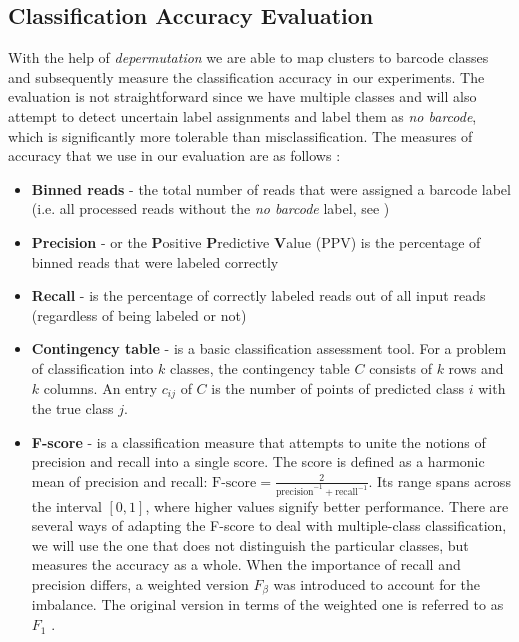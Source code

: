 \subsection{Classification Accuracy Evaluation}
\label{sec:classification_metrics}
With the help of \textit{depermutation} we are able to map clusters to barcode classes and subsequently measure the classification accuracy in our experiments. The evaluation is not straightforward since we have multiple classes and will also attempt to detect uncertain label assignments and label them as \textit{no barcode}, which is significantly more tolerable than misclassification. The measures of accuracy that we use in our evaluation are as follows \cite{tharwat2018classification}:

\begin{itemize}
    \item \textbf{Binned reads} - the total number of reads that were assigned a barcode label (i.e. all processed reads without the \textit{no barcode} label, see \cite{Deepbinner})
    \item \textbf{Precision} - or the \textbf{P}ositive \textbf{P}redictive \textbf{V}alue (PPV) is the percentage of binned reads that were labeled correctly
    \item \textbf{Recall} - is the percentage of correctly labeled reads out of all input reads (regardless of being labeled or not)
    \item \textbf{Contingency table} - is a basic classification assessment tool. For a problem of classification into $k$ classes, the contingency table $C$ consists of $k$ rows and $k$ columns. An entry $c_{ij}$ of $C$ is the number of points of predicted class $i$ with the true class $j$. 
    \item \textbf{F-score} - is a classification measure that attempts to unite the notions of precision and recall into a single score. The score is defined as a harmonic mean of precision and recall: $\text{F-score} = \frac{2}{\text{precision}^{-1} + \text{recall}^{-1}}$. Its range spans across the interval $[0, 1]$, where higher values signify better performance. There are several ways of adapting the F-score to deal with multiple-class classification, we will use the one that does not distinguish the particular classes, but measures the accuracy as a whole. When the importance of recall and precision differs, a weighted version $F_{\beta}$ was introduced to account for the imbalance. The original version in terms of the weighted one is referred to as $F_1$ \cite{tharwat2018classification}.
\end{itemize}

